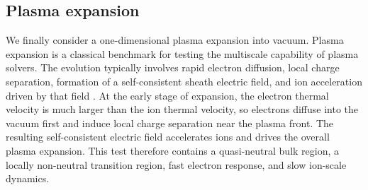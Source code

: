 \documentclass[pdflatex,final,10pt]{article}
\begin{document}

\subsection{Plasma expansion}
We finally consider a one-dimensional plasma expansion into vacuum. Plasma expansion is a classical benchmark for testing the multiscale capability of plasma solvers. The evolution typically involves rapid electron diffusion, local charge separation, formation of a self-consistent sheath electric field, and ion acceleration driven by that field \cite{mora2003plasma}. At the early stage of expansion, the electron thermal velocity is much larger than the ion thermal velocity, so electrons diffuse into the vacuum first and induce local charge separation near the plasma front. The resulting self-consistent electric field accelerates ions and drives the overall plasma expansion. This test therefore contains a quasi-neutral bulk region, a locally non-neutral transition region, fast electron response, and slow ion-scale dynamics.
\end{document}
